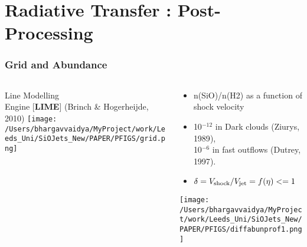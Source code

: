 \documentclass[8pt,xcolor=dvipsnames]{beamer}
\begin{document}
\section[Rad. Transfer]{Radiative Transfer : Post-Processing}
\begin{frame}
\frametitle{Grid and Abundance}
\begin{columns}[T]
    \begin{column}{.4\textwidth}
      Line Modelling\\
      Engine [\textbf{LIME}] (\alert{Brinch \& Hogerheijde, 2010}) 
      \texttt{[image: /Users/bhargavvaidya/MyProject/work/Leeds\_Uni/SiOJets\_New/PAPER/PFIGS/grid.png]} 
    \end{column}
    \begin{column}{.6\textwidth}
      \small{
        \begin{itemize}
          \item n(SiO)/n(H2) as a function of shock velocity
           \item 10$^{-12}$ in Dark clouds (\alert{Ziurys, 1989}),\\
            10$^{-6}$ in fast outflows (\alert{Dutrey, 1997}).
          \item $\delta = V_{\rm shock}/ V_{\rm jet} = f(\eta) <= 1$
         \end{itemize}
       }
        
      \texttt{[image: /Users/bhargavvaidya/MyProject/work/Leeds\_Uni/SiOJets\_New/PAPER/PFIGS/diffabunprof1.png]}
      \end{column}
     \end{columns}   
\end{frame}
\end{document}
